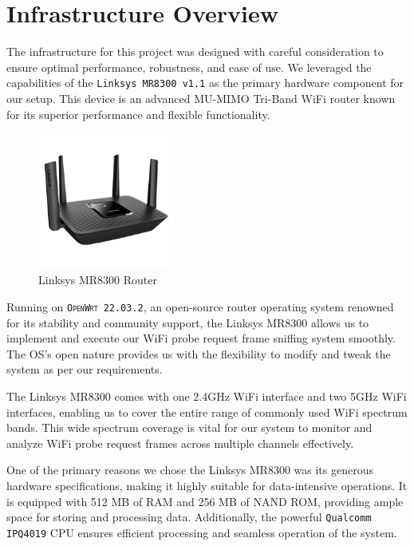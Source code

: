\documentclass{article}
\begin{document}
\section{Infrastructure Overview}

The infrastructure for this project was designed with careful consideration to ensure optimal performance, robustness, and ease of use. We leveraged the capabilities of the \texttt{Linksys MR8300 v1.1} as the primary hardware component for our setup. This device is an advanced MU-MIMO Tri-Band WiFi router known for its superior performance and flexible functionality.

\begin{figure}[h]
    \centering
    \includegraphics[width=0.4\textwidth]{assets/linksys_mr800.png}
    \caption{Linksys MR8300 Router}
    \label{fig:router}
\end{figure}

Running on \texttt{\textsc{OpenWrt} 22.03.2}, an open-source router operating system renowned for its stability and community support, the Linksys MR8300 allows us to implement and execute our WiFi probe request frame sniffing system smoothly. The OS's open nature provides us with the flexibility to modify and tweak the system as per our requirements.

The Linksys MR8300 comes with one 2.4GHz WiFi interface and two 5GHz WiFi interfaces, enabling us to cover the entire range of commonly used WiFi spectrum bands. This wide spectrum coverage is vital for our system to monitor and analyze WiFi probe request frames across multiple channels effectively.

One of the primary reasons we chose the Linksys MR8300 was its generous hardware specifications, making it highly suitable for data-intensive operations. It is equipped with 512 MB of RAM and 256 MB of NAND ROM, providing ample space for storing and processing data. Additionally, the powerful \texttt{Qualcomm IPQ4019} CPU ensures efficient processing and seamless operation of the system.
\end{document}
